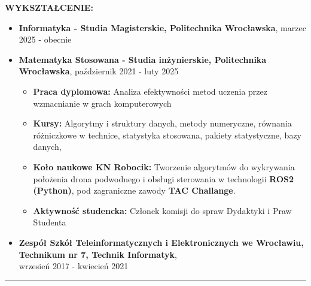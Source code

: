 \documentclass[10pt]{article}
\begin{document}
\noindent \fontsize{14pt}{14pt}\selectfont \textbf{\color{Violet}WYKSZTAŁCENIE:}
\fontsize{10pt}{10pt}\selectfont
\begin{itemize}[leftmargin=*]
    \item \textbf{Informatyka - Studia Magisterskie, Politechnika Wrocławska}, marzec 2025 - obecnie
    \item \textbf{Matematyka Stosowana - Studia inżynierskie, Politechnika Wrocławska}, październik 2021 - luty 2025
    \begin{itemize}
    \item \textbf{Praca dyplomowa:} Analiza efektywności metod uczenia przez wzmacnianie w grach komputerowych
    \item \textbf{Kursy:} Algorytmy i struktury danych, metody numeryczne, równania różniczkowe w technice, statystyka stosowana, pakiety statystyczne, bazy danych, 
    \item \textbf{Koło naukowe KN Robocik:} Tworzenie algorytmów do wykrywania położenia drona podwodnego i obsługi sterowania w technologii \textbf{ROS2 (Python)}, pod zagraniczne zawody \textbf{TAC Challange}. 
    \item \textbf{Aktywność studencka:} Członek komisji do spraw Dydaktyki i Praw Studenta
    \end{itemize}
    \item \textbf{Zespół Szkół Teleinformatycznych i Elektronicznych we Wrocławiu, Technikum nr 7, Technik Informatyk}, \\
    wrzesień 2017 - kwiecień 2021 
\end{itemize}
\rule{17cm}{1pt} \\
\end{document}
